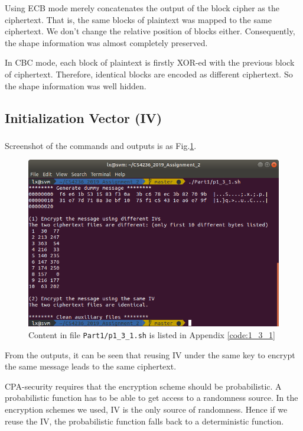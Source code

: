 Using ECB mode merely concatenates the output of the block cipher as the ciphertext. 
That is, the same blocks of plaintext was mapped to the same ciphertext.
We don't change the relative position of blocks either. Consequently, the shape information was almost completely preserved. 

In CBC mode, each block of plaintext is firstly XOR-ed with the previous block of ciphertext. Therefore, identical blocks are encoded as different ciphertext. So the shape information was well hidden. 

\subsection{Initialization Vector (IV)}

\subsubsection{}

Screenshot of the commands and outputs is as Fig.\ref{fig:p1_3_1}.

\begin{figure}[t!]
\centering
\includegraphics[width=\columnwidth]{pictures/p1_3_1.png}
\caption{
    Content in file \texttt{Part1/p1\_3\_1.sh} is listed in Appendix \ref{code:1_3_1}
}
\label{fig:p1_3_1}
\end{figure}

From the outputs, it can be seen that reusing IV under the same key to encrypt the same message leads to the same ciphertext.

CPA-security requires that the encryption scheme should be probabilistic. 
A probabilistic function has to be able to get access to a randomness source.
In the encryption schemes we used, IV is the only source of randomness.
Hence if we reuse the IV, the probabilistic function falls back to a deterministic function.

